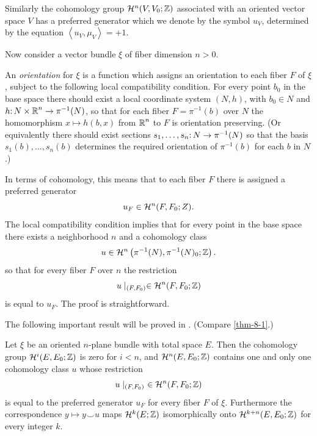 Similarly the cohomology group $\mathcal{H}^{ n }(V, V_{0} ; \mathbb{Z})$ associated with an oriented vector space $V$ has a preferred generator which we denote by the symbol $u_{V}$, determined by the equation $\left\langle u_{V}, \mu_{V}\right\rangle=+1$.

Now consider a vector bundle $\xi$ of fiber dimension $ n >0$.

\begin{definition}\label{def:9-2}
	An \textit{orientation} for $\xi$ is a function which assigns an orientation to each fiber $F$ of $\xi$, subject to the following local compatibility condition. For every point $b_{0}$ in the base space there should exist a local coordinate system $(N , h)$, with $b_{0} \in  N$ and $\map{h}{N\times \R^{ n }}{\pi^{-1}(N)}$, so that for each fiber $F=\pi^{-1}( b )$ over $ N $ the homomorphism $x \mapsto h(b, x)$ from $\boldsymbol{\mathbb{R}}^{ n }$ to $F$ is orientation preserving. (Or equivalently there should exist sections $\map{s_{1}, \dots, s_{n}}{N}{\pi^{-1}(N)}$ so that the basis $s_{1}(b), \dots, s_{n}(b)$ determines the required orientation of $\pi^{-1}(b)$  for each $b$ in $N$.)
\end{definition} 

In terms of cohomology, this means that to each fiber $F$ there is assigned a preferred generator
\[
u_{F} \in \mathcal{H}^{n}(F, F_{0} ; Z).
\]
The local compatibility condition implies that for every point in the base space there exists a neighborhood $ n $ and a cohomology class
\[
u \in \mathcal{H}^{ n }\left(\pi^{-1}(N), \pi^{-1}(N)_{0} ; \mathbb{Z}\right).
\]
so that for every fiber $F$ over $ n $ the restriction
\[
u \mid_{(F, F_{0})} \in \mathcal{H}^{ n }(F, F_{0} ; \mathbb{Z})
\]
is equal to $u_{F}$. The proof is straightforward.

The following important result will be proved in . (Compare \cref{thm-8-1}.)

\begin{theorem}\label{thm-9-1}
	Let $\xi$ be an oriented $n$-plane bundle with total space $E$. Then the cohomology group $\mathcal{H}^{i}(E, E_{0} ; \mathbb{Z})$ is zero for $i< n $, and $\mathcal{H}^{ n }(E, E_{0} ; \mathbb{Z})$ contains one and only one cohomology class $u$ whose restriction
	\[
	u \mid_{(F, F_{0})}\ \in \mathcal{H}^{ n }(F, F_{0} ; \mathbb{Z})
	\]
	is equal to the preferred generator $u_{F}$ for every fiber $F$ of $\xi$. Furthermore the correspondence $ y  \mapsto  y  \smile u$ maps $\mathcal{H}^{k}(E ; \mathbb{Z})$ isomorphically onto $\mathcal{H}^{k+ n }(E, E_{0} ; \mathbb{Z})$ for every integer $k$.
\end{theorem}

